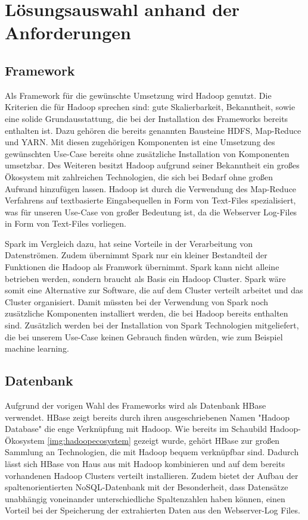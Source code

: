 \chapter[Lösungsauswahl anhand der Anforderungen]{Lösungsauswahl anhand der Anforderungen}
\label{cha:loesungsauswahl}

\section{Framework}
\label{sec:framework}

Als Framework für die gewünschte Umsetzung wird Hadoop genutzt. Die Kriterien die für Hadoop sprechen sind: gute Skalierbarkeit, Bekanntheit, sowie eine solide Grundausstattung, die bei der Installation des Frameworks bereits enthalten ist. Dazu gehören die bereits genannten Bausteine HDFS, Map-Reduce und YARN. Mit diesen zugehörigen Komponenten ist eine Umsetzung des gewünschten Use-Case bereits ohne zusätzliche Installation von Komponenten umsetzbar. Des Weiteren besitzt Hadoop aufgrund seiner Bekanntheit ein großes Ökosystem mit zahlreichen Technologien, die sich bei Bedarf ohne großen Aufwand hinzufügen lassen. Hadoop ist durch die Verwendung des Map-Reduce Verfahrens auf textbasierte Eingabequellen in Form von Text-Files spezialisiert, was für unseren Use-Case von großer Bedeutung ist, da die Webserver Log-Files in Form von Text-Files vorliegen.

Spark im Vergleich dazu, hat seine Vorteile in der Verarbeitung von Datenströmen. Zudem übernimmt Spark nur ein kleiner Bestandteil der Funktionen die Hadoop als Framwork übernimmt. Spark kann nicht alleine betrieben werden, sondern braucht als Basis ein Hadoop Cluster. Spark wäre somit eine Alternative zur Software, die auf dem Cluster verteilt arbeitet und das Cluster organisiert. Damit müssten bei der Verwendung von Spark noch zusätzliche Komponenten installiert werden, die bei Hadoop bereits enthalten sind. Zusätzlich werden bei der Installation von Spark Technologien mitgeliefert, die bei unserem Use-Case keinen Gebrauch finden würden, wie zum Beispiel machine learning. 

\pagebreak

\section{Datenbank}
\label{sec:datenbank}

Aufgrund der vorigen Wahl des Frameworks wird als Datenbank HBase verwendet. HBase zeigt bereits durch ihren ausgeschriebenen Namen "Hadoop Database" die enge Verknüpfung mit Hadoop. Wie bereits im Schaubild Hadoop-Ökosystem \ref{img:hadoopecosystem} gezeigt wurde, gehört HBase zur großen Sammlung an Technologien, die mit Hadoop bequem verknüpfbar sind. Dadurch lässt sich HBase von Haus aus mit Hadoop kombinieren und auf dem bereits vorhandenen Hadoop Clusters verteilt installieren. Zudem bietet der Aufbau der spaltenorientierten NoSQL-Datenbank mit der Besonderheit, dass Datensätze unabhängig voneinander unterschiedliche Spaltenzahlen haben können, einen Vorteil bei der Speicherung der extrahierten Daten aus den Webserver-Log Files. 

